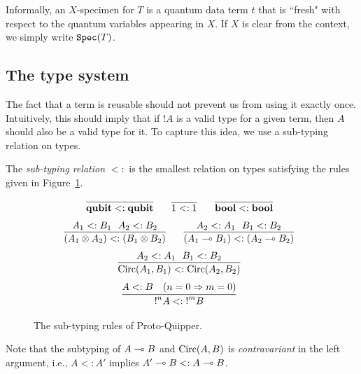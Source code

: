 \documentclass[twoside]{article}
\begin{document}

Informally, an $X$-specimen for $T$ is a quantum data term $t$ that is 
``fresh" with respect to the quantum variables appearing in $X$.
If $X$ is clear from the context, we simply write $\texttt{Spec} (T)$.


\subsection{The type system}

The fact that a term is reusable should not prevent us from using it
exactly once. Intuitively, this should imply that if ${!}A$ is a valid
type for a given term, then $A$ should also be a valid type for it.
To capture this idea, we use a sub-typing relation on types.

\begin{definition}
The \emph{sub-typing relation} $<:$ is the smallest relation on 
types satisfying the rules given in 
Figure~\hyperref[subtyping_congruences]{\ref*{subtyping_congruences}}.
\end{definition}

\begin{figure}[!ht]
\begin{mdframed}
\[
  \infer[]{\qubit <: \qubit}{}
~~~~
  \infer[]{1 <: 1}{}
~~~~
  \infer[]{\bool <: \bool}{}
\]
\[
  \infer[]{ (A_1\x A_2) <:  (B_1 \x B_2)}{A_1<:B_1~~A_2<:B_2}
~~~~
  \infer[]{ (A_1\loli B_1) <: (A_2\loli B_2)}{A_2<:A_1~~B_1<:B_2}
\]
\[
  \infer[]{ \Circ(A_1, B_1) <:  \Circ(A_2, B_2)}{A_2<:A_1~~B_1<:B_2}
\]
\[
  \infer[]{ {!}^nA <: {!}^mB}{
    A<:B
    &
    (n=0 \imp m=0)
  }
\]
%
\end{mdframed}
\caption{The sub-typing rules of Proto-Quipper.}
\label{subtyping_congruences}
\end{figure}

Note that the subtyping of $A\multimap B$ and $\mathop{\textrm{Circ}}\nolimits(A,B)$ is {\em
  contravariant} in the left argument, i.e., $A<:A'$ implies $A'\multimap
B<:A\multimap B$.
\end{document}
